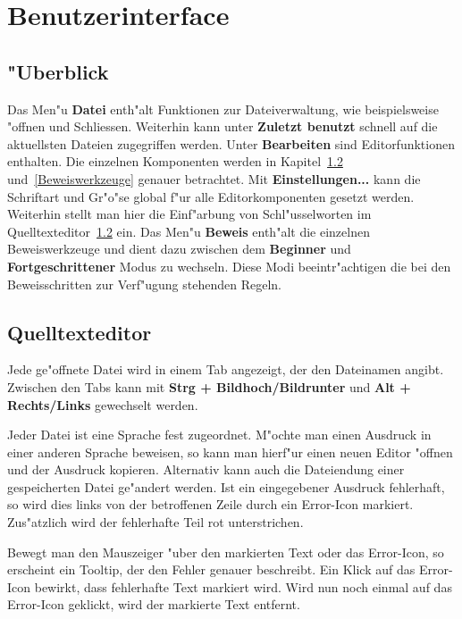
\chapter{Benutzerinterface}

\section{"Uberblick}

Das Men"u {\bf Datei} enth"alt Funktionen zur Dateiverwaltung, wie
beispielsweise "offnen und Schliessen. Weiterhin kann unter {\bf
Zuletzt benutzt} schnell auf die aktuellsten Dateien zugegriffen
werden. Unter {\bf Bearbeiten} sind Editorfunktionen enthalten. Die
einzelnen Komponenten werden in Kapitel~\ref{Qelltexteditor}
und~\ref{Beweiswerkzeuge} genauer betrachtet. Mit {\bf
Einstellungen...} kann die Schriftart und Gr"o"se global f"ur alle
Editorkomponenten gesetzt werden. Weiterhin stellt man hier die
Einf"arbung von Schl"usselworten im
Quelltexteditor~\ref{Qelltexteditor} ein. Das Men"u {\bf Beweis}
enth"alt die einzelnen Beweiswerkzeuge und dient dazu zwischen dem
{\bf Beginner} und {\bf Fortgeschrittener} Modus zu wechseln. Diese
Modi beeintr"achtigen die bei den Beweisschritten zur Verf"ugung
stehenden Regeln.

\section {Quelltexteditor}
\label{Qelltexteditor} Jede ge"offnete Datei wird in einem Tab
angezeigt, der den Dateinamen angibt. Zwischen den Tabs kann mit
{\bf Strg + Bildhoch/Bildrunter} und {\bf Alt + Rechts/Links}
gewechselt werden.

Jeder Datei ist eine Sprache fest zugeordnet. M"ochte man einen
Ausdruck in einer anderen Sprache beweisen, so kann man hierf"ur
einen neuen Editor "offnen und der Ausdruck kopieren. Alternativ
kann auch die Dateiendung einer gespeicherten Datei ge"andert
werden. Ist ein eingegebener Ausdruck fehlerhaft, so wird dies links
von der betroffenen Zeile durch ein Error-Icon markiert. Zus"atzlich 
wird der fehlerhafte Teil rot unterstrichen.

Bewegt man den Mauszeiger "uber den markierten Text oder das Error-Icon,
so erscheint ein Tooltip, der den Fehler genauer beschreibt. Ein Klick
auf das Error-Icon bewirkt, dass fehlerhafte Text markiert wird. Wird
nun noch einmal auf das Error-Icon geklickt, wird der markierte Text
entfernt.

